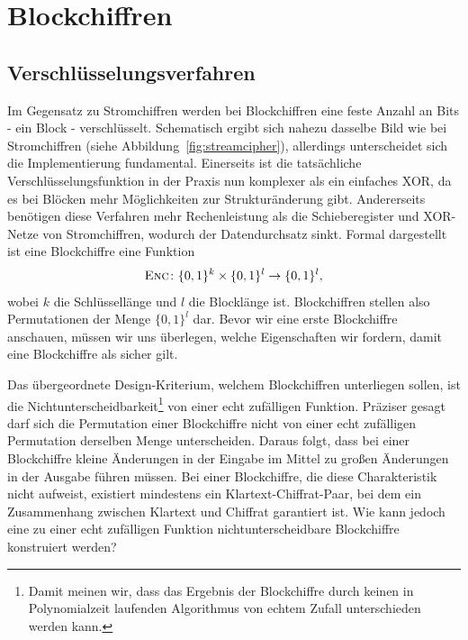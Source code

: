 \section{Blockchiffren}
\label{sec:blockchiffren}
\subsection{Verschlüsselungsverfahren}
Im Gegensatz zu Stromchiffren werden bei Blockchiffren eine feste Anzahl an Bits - ein Block - verschlüsselt. Schematisch ergibt sich nahezu dasselbe Bild wie bei Stromchiffren (siehe Abbildung~\ref{fig:streamcipher}), allerdings unterscheidet sich die Implementierung fundamental. Einerseits ist die tatsächliche Verschlüsselungsfunktion in der Praxis nun komplexer als ein einfaches XOR, da es bei Blöcken mehr Möglichkeiten zur Strukturänderung gibt. Andererseits benötigen diese Verfahren mehr Rechenleistung als die Schieberegister und XOR-Netze von Stromchiffren, wodurch der Datendurchsatz sinkt.
Formal dargestellt ist eine Blockchiffre eine Funktion
\begin{align*}
	\textsc{Enc} \colon \{0, 1\}^k \times \{0, 1\}^l \rightarrow \{0, 1\}^l\text{,}
\end{align*}
wobei \(k\) die Schlüssellänge und \(l\) die Blocklänge ist. Blockchiffren stellen also Permutationen der Menge 
\(\{0, 1\}^l\) dar.
Bevor wir eine erste Blockchiffre anschauen, müssen wir uns überlegen, welche Eigenschaften wir fordern, damit eine Blockchiffre als sicher gilt.

Das übergeordnete Design-Kriterium, welchem Blockchiffren unterliegen sollen, ist die Nichtunterscheidbarkeit\footnote{Damit meinen wir, dass das Ergebnis der Blockchiffre durch keinen in Polynomialzeit laufenden Algorithmus von echtem Zufall unterschieden werden kann.} von einer echt zufälligen Funktion. Präziser gesagt darf sich die Permutation einer Blockchiffre nicht von einer echt zufälligen Permutation derselben Menge unterscheiden. Daraus folgt, dass bei einer Blockchiffre kleine Änderungen in der Eingabe im Mittel zu großen Änderungen in der Ausgabe führen müssen. Bei einer Blockchiffre, die diese Charakteristik nicht aufweist, existiert mindestens ein Klartext-Chiffrat-Paar, bei dem ein Zusammenhang zwischen Klartext und Chiffrat garantiert ist. Wie kann jedoch eine zu einer echt zufälligen Funktion nichtunterscheidbare Blockchiffre konstruiert werden?


